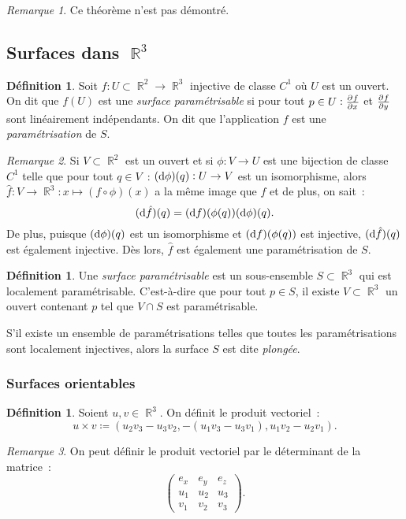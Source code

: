 \documentclass{article}
\DeclareMathOperator{\R}{\mathbb R}
\theoremstyle{definition}
\newtheorem{déf}[thm]{Définition}
\theoremstyle{remark}
\newtheorem*{rmq}{Remarque}
\begin{document}
		\begin{rmq} Ce théorème n'est pas démontré. \end{rmq}

	\subsection{Surfaces dans $\R^3$}
		\begin{déf} Soit $f : U \subset \R^2 \to \R^3$ injective de classe $C^1$ où $U$ est un ouvert. On dit que $f(U)$ est une \emph{surface paramétrisable} si
		pour tout $p \in U : \pd fx$ et $\pd fy$ sont linéairement indépendants. On dit que l'application $f$ est une \emph{paramétrisation} de $S$.
		\end{déf}

		\begin{rmq} Si $V \subset \R^2$ est un ouvert et si $\phi : V \to U$ est une bijection de classe $C^1$ telle que pour tout $q \in V$~:
		$(\dif \phi)(q) : U \to V$ est un isomorphisme, alors $\hat f : V \to \R^3 : x \mapsto (f \circ \phi)(x)$ a la même image que $f$ et de plus, on sait~:
		\[(\dif \hat f)(q) = (\dif f)(\phi(q))(\dif \phi)(q).\]
		De plus, puisque $(\dif \phi)(q)$ est un isomorphisme et $(\dif f)(\phi(q))$ est injective, $(\dif \hat f)(q)$ est également injective. Dès lors, $\hat f$
		est également une paramétrisation de $S$.
		\end{rmq}

		\begin{déf} Une \emph{surface paramétrisable} est un sous-ensemble $S \subset \R^3$ qui est localement paramétrisable. C'est-à-dire que pour tout
		$p \in S$, il existe $V \subset \R^3$ un ouvert contenant $p$ tel que $V \cap S$ est paramétrisable.

		S'il existe un ensemble de paramétrisations telles que toutes les paramétrisations sont localement injectives, alors la surface $S$ est dite
		\emph{plongée}.
		\end{déf}

		\subsubsection{Surfaces orientables}
		\begin{déf} Soient $u, v \in \R^3$. On définit le produit vectoriel~:
		\[u \times v \coloneqq \left(u_2v_3 - u_3v_2, -(u_1v_3 - u_3v_1), u_1v_2 - u_2v_1\right).\]
		\end{déf}

		\begin{rmq} On peut définir le produit vectoriel par le déterminant de la matrice~:
		\[\begin{pmatrix}
			e_x & e_y & e_z \\
			u_1 & u_2 & u_3 \\
			v_1 & v_2 & v_3
		\end{pmatrix}.\]
		\end{rmq}
\end{document}
